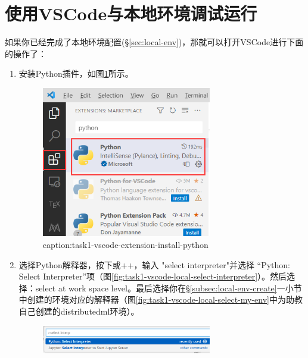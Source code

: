 \section{使用VSCode与本地环境调试运行}\label{sec:task1-local-debug}

如果你已经完成了本地环境配置(\S\ref{sec:local-env})，那就可以打开VSCode进行下面的操作了：

\begin{enumerate}
    \item 安装Python插件，如图\ref{fig:task1-vscode-extension-install-python}所示。
        \begin{figure}[htbp]
            \centering
            \includegraphics[width=0.7\textwidth]{figures/task1-vscode-extension-install-python.png}
            \caption{caption:task1-vscode-extension-install-python}
            \label{fig:task1-vscode-extension-install-python}
        \end{figure}
    \item 选择Python解释器，按下或++，输入 "select interpreter"并选择 “Python: Select Interpreter”项（图\ref{fig:task1-vscode-local-select-interpreter}）。然后选择：select at work space level。最后选择你在\S\ref{subsec:local-env-create}一小节中创建的环境对应的解释器（图\ref{fig:task1-vscode-local-select-my-env}中为助教自己创建的distributedml环境）。
        \begin{figure}[htbp]
            \centering
            \includegraphics[width=0.7\textwidth]{figures/task1-vscode-local-select-interpreter.png}

\end{figure}
\end{enumerate}
